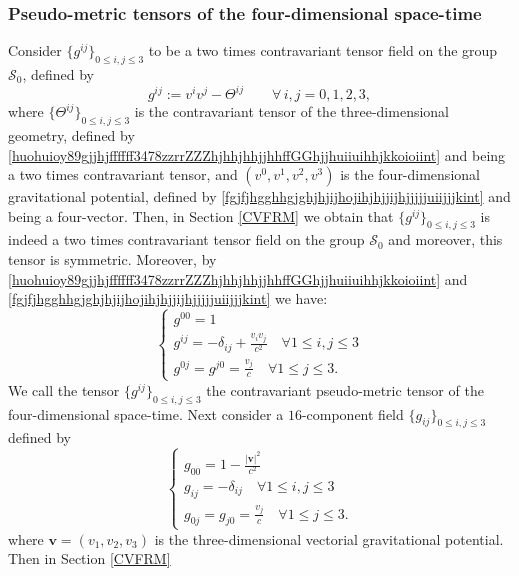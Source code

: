 \documentclass{article}
\theoremstyle{definition}
\theoremstyle{remark}
\renewcommand{\vec}[1]{\mathbf{#1}}
\newcommand{\er}{\eqref}
\newcommand{\er}{\eqref}
\begin{document}
\subsubsection{Pseudo-metric tensors of the four-dimensional
space-time} Consider $\{g^{ij}\}_{0\leq i,j\leq 3}$ to be a two
times contravariant tensor field on the group $\mathcal{S}_0$,
defined by
\begin{equation}\label{hoyuiouigyfghgjh3478zzrrZZffGGjkkjojjint}
g^{ij}:=v^iv^j-{\Theta}^{ij}\quad\quad\forall\,i,j=0,1,2,3,
\end{equation}
where $\{{\Theta}^{ij}\}_{0\leq i,j\leq 3}$ is the contravariant
tensor of the three-dimensional geometry, defined by
\er{huohuioy89gjjhjffffff3478zzrrZZZhjhhjhhjjhhffGGhjjhuiiuihhjkkoioiint}
and being a two times contravariant tensor, and $(v^0,v^1,v^2,v^3)$
is the four-dimensional gravitational potential, defined by
\er{fgjfjhgghhgjghjhjijhojihjhjjijhjjjjjuiijjjkint} and being a
four-vector. Then,
in Section \ref{CVFRM} we obtain that $\{g^{ij}\}_{0\leq i,j\leq 3}$
is indeed a two times contravariant tensor field on the group
$\mathcal{S}_0$ and moreover, this tensor is symmetric. Moreover, by
\er{huohuioy89gjjhjffffff3478zzrrZZZhjhhjhhjjhhffGGhjjhuiiuihhjkkoioiint}
and \er{fgjfjhgghhgjghjhjijhojihjhjjijhjjjjjuiijjjkint} we have:
\begin{equation}\label{hoyuiouigyfghgjh3478zzrrZZffGGjkkjint}
\begin{cases}
g^{00}=1\\
g^{ij}=-\delta_{ij}+\frac{v_iv_j}{c^2}\quad\forall 1\leq i,j\leq 3\\
g^{0j}=g^{j0}=\frac{v_j}{c}\quad\forall 1\leq j\leq 3.
\end{cases}
\end{equation}
We call the tensor $\{g^{ij}\}_{0\leq i,j\leq 3}$ the contravariant
pseudo-metric tensor of the four-dimensional space-time. Next
consider a $16$-component field $\{g_{ij}\}_{0\leq i,j\leq 3}$
defined by
\begin{equation}\label{hoyuiouigyfg3478zzrrZZffGGhhjhjint}
\begin{cases}
g_{00}=1-\frac{|\vec v|^2}{c^2}\\
g_{ij}=-\delta_{ij}\quad\forall 1\leq i,j\leq 3\\
g_{0j}=g_{j0}=\frac{v_j}{c}\quad\forall 1\leq j\leq 3.
\end{cases}
\end{equation}
where $\vec v=(v_1,v_2,v_3)$ is the three-dimensional vectorial
gravitational potential. Then in Section \ref{CVFRM}
\end{document}
